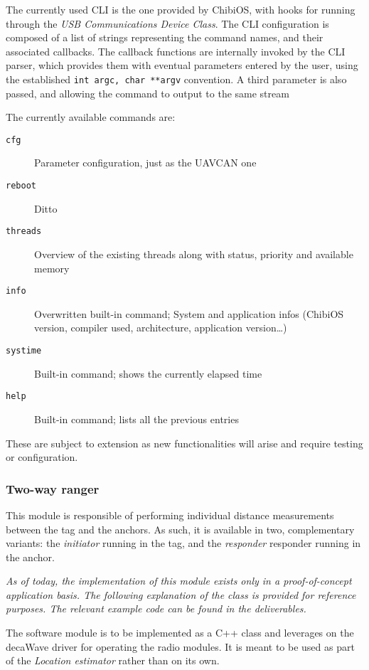 The currently used CLI is the one provided by ChibiOS, with hooks for running through the \emph{USB Communications Device Class}.
The CLI configuration is composed of a list of strings representing the command names, and their associated callbacks.
The callback functions are internally invoked by the CLI parser, which provides them with eventual parameters entered by the user, using the established \texttt{int argc, char **argv} convention.
A third parameter is also passed, and allowing the command to output to the same stream

The currently available commands are:
\begin{description}
    \item[\texttt{cfg}] Parameter configuration, just as the UAVCAN one
    \item[\texttt{reboot}] Ditto
    \item[\texttt{threads}] Overview of the existing threads along with status, priority and available memory
    \item[\texttt{info}] Overwritten built-in command; System and application infos (ChibiOS version, compiler used, architecture, application version\dots)
    \item[\texttt{systime}] Built-in command; shows the currently elapsed time
    \item[\texttt{help}] Built-in command; lists all the previous entries
\end{description}

These are subject to extension as new functionalities will arise and require testing or configuration.


\subsubsection{Two-way ranger}
This module is responsible of performing individual distance measurements between the tag and the anchors.
As such, it is available in two, complementary variants: the \emph{initiator} running in the tag, and the \emph{responder} responder running in the anchor.

\emph{As of today, the implementation of this module exists only in a proof-of-concept application basis.
The following explanation of the class is provided for reference purposes.
The relevant example code can be found in the deliverables.}

The software module is to be implemented as a C++ class and leverages on the decaWave driver for operating the radio modules.
It is meant to be used as part of the \emph{Location estimator} rather than on its own.


